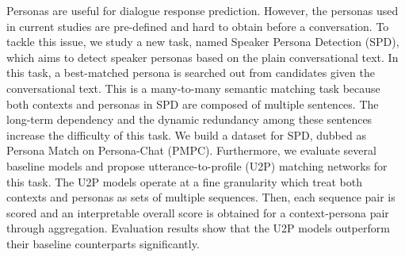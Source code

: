 Personas are useful for dialogue response prediction. However, the personas used in current studies are pre-defined and hard to obtain before a conversation. To tackle this issue, we study a new task, named Speaker Persona Detection (SPD), which aims to detect speaker personas based on the plain conversational text. In this task, a best-matched persona is searched out from candidates given the conversational text. This is a many-to-many semantic matching task because both contexts and personas in SPD are composed of multiple sentences. The long-term dependency and the dynamic redundancy among these sentences increase the difficulty of this task. We build a dataset for SPD, dubbed as Persona Match on Persona-Chat (PMPC). Furthermore, we evaluate several baseline models and propose utterance-to-profile (U2P) matching networks for this task. The U2P models operate at a fine granularity which treat both contexts and personas as sets of multiple sequences. Then, each sequence pair is scored and an interpretable overall score is obtained for a context-persona pair through aggregation. Evaluation results show that the U2P models outperform their baseline counterparts significantly.
